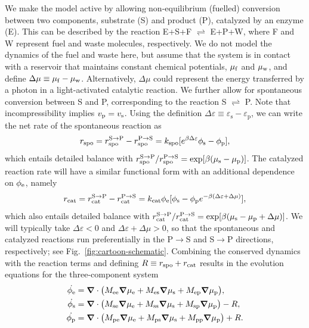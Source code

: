 We make the model active by allowing non-equilibrium (fuelled) conversion between two components, substrate (S) and product (P), catalyzed by an enzyme (E). This can be described by the reaction E+S+F $\rightleftharpoons$ E+P+W, where F and W represent fuel and waste molecules, respectively. We do not model the dynamics of the fuel and waste here, but assume that the system is in contact with a reservoir that maintains constant chemical potentials, $\mu_{\mathrm{f}}$ and $\mu_{\mathrm{w}}$, and define $\Delta\mu \equiv \mu_{\mathrm{f}}-\mu_{\mathrm{w}}$. Alternatively, $\Delta \mu$ could represent the energy transferred by a photon in a light-activated catalytic reaction. We further allow for spontaneous conversion between S and P, corresponding to the reaction S $\rightleftharpoons$ P. Note that incompressibility implies $v_{\mathrm{p}} = v_{\mathrm{s}}$. Using the definition $\Delta \varepsilon \equiv \varepsilon_\mathrm{s}-\varepsilon_\mathrm{p}$, we can write the net rate of the spontaneous reaction as
\begin{equation}
    r_{\mathrm{spo}} = r_{\mathrm{spo}}^{\mathrm{S}\to\mathrm{P}} - r_{\mathrm{spo}}^{\mathrm{P}\to\mathrm{S}} = k_{\mathrm{spo}}[e^{\beta \Delta \varepsilon}\phi_{\mathrm{s}} - \phi_{\mathrm{p}}],
\end{equation}
which entails detailed balance with $r_{\mathrm{spo}}^{\mathrm{S}\to\mathrm{P}}/r_{\mathrm{spo}}^{\mathrm{P}\to\mathrm{S}} =\mathrm{exp}[\beta (\mu_{\mathrm{s}}-\mu_{\mathrm{p}})]$. The catalyzed reaction rate will have a similar functional form with an additional dependence on $\phi_{\mathrm{e}}$, namely 
\begin{equation}
    r_{\mathrm{cat}} = r_{\mathrm{cat}}^{\mathrm{S}\to\mathrm{P}} - r_{\mathrm{cat}}^{\mathrm{P}\to\mathrm{S}} = k_{\mathrm{cat}}\phi_{\mathrm{e}}[\phi_{\mathrm{s}}-\phi_{\mathrm{p}} e^{-\beta(\Delta \varepsilon+ \Delta\mu)}],
    \label{r_cat}
\end{equation}
which also entails detailed balance with $r_{\mathrm{cat}}^{\mathrm{S}\to\mathrm{P}}/r_{\mathrm{cat}}^{\mathrm{P}\to\mathrm{S}}=\mathrm{exp}[\beta (\mu_{\mathrm{s}}-\mu_{\mathrm{p}}+\Delta\mu)]$. We will typically take $\Delta \varepsilon<0$ and $\Delta \varepsilon + \Delta \mu>0$, so that the spontaneous and catalyzed reactions run preferentially in the P$\to$S and S$\to$P directions, respectively; see Fig.~\ref{fig:cartoon-schematic}. Combining the conserved dynamics with the reaction terms and defining $R\equiv r_{\mathrm{spo}}+r_{\mathrm{cat}}$ results in the evolution equations for the three-component system
\begin{align}
    \dot{\phi_{\mathrm{e}}} &= \bm{\nabla} \cdot \big(M_{\mathrm{ee}}\bm{\nabla}\mu_{\mathrm{e}} + M_{\mathrm{es}}\bm{\nabla}\mu_{\mathrm{s}} + M_{\mathrm{ep}}\bm{\nabla}\mu_{\mathrm{p}}\big), \label{evoE}\\
    \dot{\phi_{\mathrm{s}}} &= \bm{\nabla} \cdot \big(M_{\mathrm{se}}\bm{\nabla}\mu_{\mathrm{e}} + M_{\mathrm{ss}}\bm{\nabla}\mu_{\mathrm{s}} + M_{\mathrm{sp}}\bm{\nabla}\mu_{\mathrm{p}}\big) - R, \label{evoS}\\
    \dot{\phi_{\mathrm{p}}} &= \bm{\nabla} \cdot \big(M_{\mathrm{pe}}\bm{\nabla}\mu_{\mathrm{e}} + M_{\mathrm{ps}}\bm{\nabla}\mu_{\mathrm{s}} + M_{\mathrm{pp}}\bm{\nabla}\mu_{\mathrm{p}}\big) + R. \label{evoP}
\end{align}

